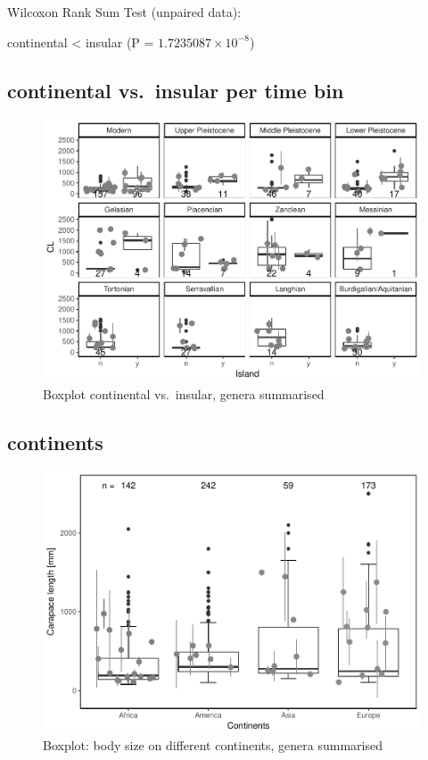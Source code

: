 \documentclass[]{article}
\begin{document}
Wilcoxon Rank Sum Test (unpaired data):

continental \textless{} insular (P = \(1.7235087\times 10^{-8}\))

\newpage

\subsection{continental vs.~insular per time
bin}\label{continental-vs.insular-per-time-bin-1}

\begin{figure}[htbp]
\centering
\includegraphics{MA_JJ_files/figure-latex/BPCIBins-1.pdf}
\caption{Boxplot continental vs.~insular, genera summarised}
\end{figure}

\newpage

\subsection{continents}\label{continents-1}

\begin{figure}[htbp]
\centering
\includegraphics{MA_JJ_files/figure-latex/BPCon-1.pdf}
\caption{Boxplot: body size on different continents, genera summarised}
\end{figure}
\end{document}
